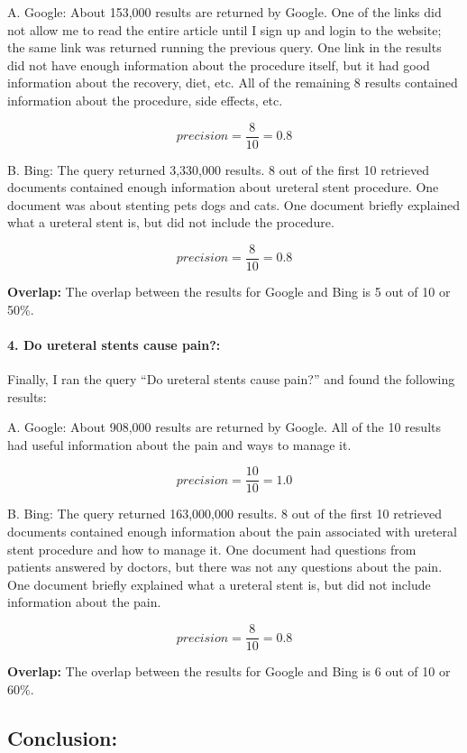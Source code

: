 \documentclass[a4paper, 11pt]{article}
\begin{document}
A. Google: About 153,000 results are returned by Google. One of the links did not allow me to read the entire article until I sign up and login to the website; the same link was returned running the previous query. One link in the results did not have enough information about the procedure itself, but it had good information about the recovery, diet, etc. All of the remaining 8 results contained information about the procedure, side effects, etc.

$$ 
precision = \frac{8}{10} = 0.8
$$

B. Bing: The query returned 3,330,000 results. 8 out of the first 10 retrieved documents contained enough information about ureteral stent procedure. One document was about stenting pets dogs and cats. One document briefly explained what a ureteral stent is, but did not include the procedure.  

$$ 
precision = \frac{8}{10} = 0.8
$$


\textbf{Overlap:}
The overlap between the results for Google and Bing is 5 out of 10 or 50\%. 

\paragraph{4. Do ureteral stents cause pain?:}

Finally, I ran the query ``Do ureteral stents cause pain?''  and found the following results:

A. Google: About 908,000 results are returned by Google. All of the 10 results had useful information about the pain and ways to manage it.

$$ 
precision = \frac{10}{10} = 1.0
$$

B. Bing: The query returned 163,000,000 results. 8 out of the first 10 retrieved documents contained enough information about the pain associated with ureteral stent procedure and how to manage it. One document had questions from patients answered by doctors, but there was not any questions about the pain. One document briefly explained what a ureteral stent is, but did not include information about the pain.  

$$ 
precision = \frac{8}{10} = 0.8
$$

\textbf{Overlap:}
The overlap between the results for Google and Bing is 6 out of 10 or 60\%. 

\subsection*{Conclusion:}
\end{document}
